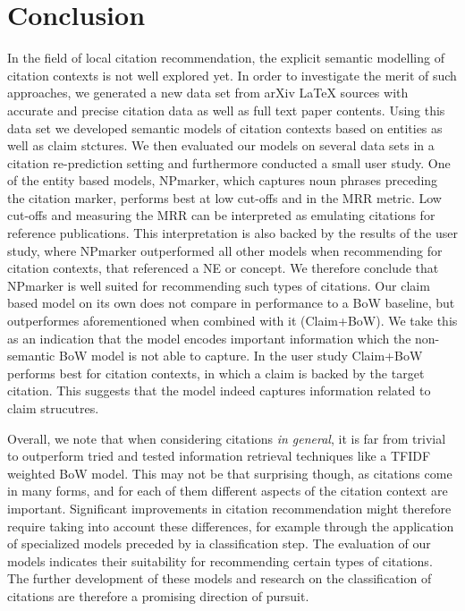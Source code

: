 \chapter{Conclusion}\label{chap:conclusion}
In the field of local citation recommendation, the explicit semantic modelling of citation contexts is not well explored yet. In order to investigate the merit of such approaches, we generated a new data set from arXiv \LaTeX{} sources with accurate and precise citation data as well as full text paper contents. Using this data set we developed semantic models of citation contexts based on entities as well as claim stctures. We then evaluated our models on several data sets in a citation re-prediction setting and furthermore conducted a small user study. One of the entity based models, NPmarker, which captures noun phrases preceding the citation marker, performs best at low cut-offs and in the MRR metric. Low cut-offs and measuring the MRR can be interpreted as emulating citations for reference publications. This interpretation is also backed by the results of the user study, where NPmarker outperformed all other models when recommending for citation contexts, that referenced a NE or concept. We therefore conclude that NPmarker is well suited for recommending such types of citations. Our claim based model on its own does not compare in performance to a BoW baseline, but outperformes aforementioned when combined with it (Claim+BoW). We take this as an indication that the model encodes important information which the non-semantic BoW model is not able to capture. In the user study Claim+BoW performs best for citation contexts, in which a claim is backed by the target citation. This suggests that the model indeed captures information related to claim strucutres.

Overall, we note that when considering citations \emph{in general}, it is far from trivial to outperform tried and tested information retrieval techniques like a TFIDF weighted BoW model. This may not be that surprising though, as citations come in many forms, and for each of them different aspects of the citation context are important. Significant improvements in citation recommendation might therefore require taking into account these differences, for example through the application of specialized models preceded by ia classification step. The evaluation of our models indicates their suitability for recommending certain types of citations. The further development of these models and research on the classification of citations are therefore a promising direction of pursuit.
